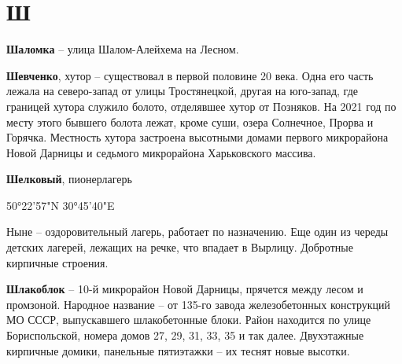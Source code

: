 \chapter*{Ш}

\textbf{Шаломка} – улица Шалом-Алейхема на Лесном.\\

\medskip

\textbf{Шевченко}, хутор – существовал в первой половине 20 века. Одна его часть лежала на северо-запад от улицы Тростянецкой, другая на юго-запад, где границей хутора служило болото, отделявшее хутор от Позняков. На 2021 год по месту этого бывшего болота лежат, кроме суши, озера Солнечное, Прорва и Горячка. Местность хутора застроена высотными домами первого микрорайона Новой Дарницы и седьмого микрорайона Харьковского массива.\\

\medskip


\textbf{Шелковый}, пионерлагерь

50°22'57"N 30°45'40"E

Ныне – оздоровительный лагерь, работает по назначению. Еще один из череды детских лагерей, лежащих на речке, что впадает в Вырлицу. Добротные кирпичные строения.\\

\medskip


\textbf{Шлакоблок} – 10-й микрорайон Новой Дарницы, прячется между лесом и промзоной. Народное название – от 135-го завода железобетонных конструкций МО СССР, выпускавшего шлакобетонные блоки. Район находится по улице Бориспольской, номера домов 27, 29, 31, 33, 35 и так далее. Двухэтажные кирпичные домики, панельные пятиэтажки – их теснят новые высотки.
